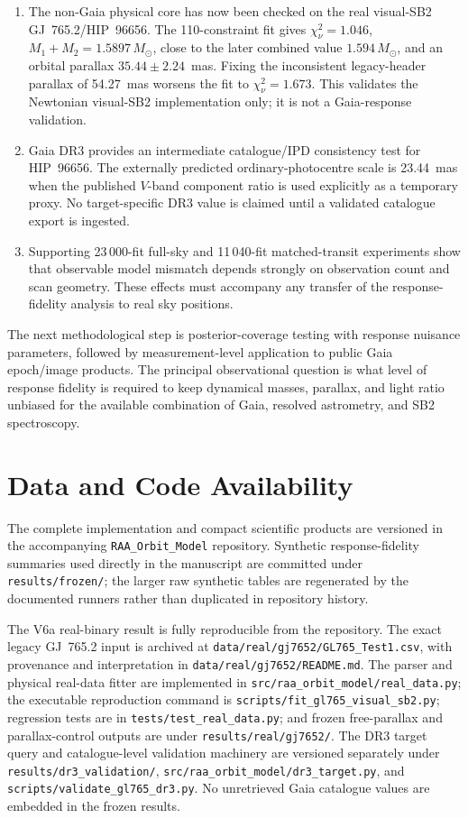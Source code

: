\begin{enumerate}
\item The non-Gaia physical core has now been checked on the real visual-SB2 GJ~765.2/HIP~96656. The 110-constraint fit gives $\chi^2_\nu=1.046$, $M_1+M_2=1.5897\,M_\odot$, close to the later combined value $1.594\,M_\odot$, and an orbital parallax $35.44\pm2.24$~mas. Fixing the inconsistent legacy-header parallax of 54.27~mas worsens the fit to $\chi^2_\nu=1.673$. This validates the Newtonian visual-SB2 implementation only; it is not a Gaia-response validation.

\item Gaia DR3 provides an intermediate catalogue/IPD consistency test for HIP~96656. The externally predicted ordinary-photocentre scale is 23.44~mas when the published $V$-band component ratio is used explicitly as a temporary proxy. No target-specific DR3 value is claimed until a validated catalogue export is ingested.

\item Supporting 23\,000-fit full-sky and 11\,040-fit matched-transit experiments show that observable model mismatch depends strongly on observation count and scan geometry. These effects must accompany any transfer of the response-fidelity analysis to real sky positions.
\end{enumerate}

The next methodological step is posterior-coverage testing with response nuisance parameters, followed by measurement-level application to public Gaia epoch/image products. The principal observational question is what level of response fidelity is required to keep dynamical masses, parallax, and light ratio unbiased for the available combination of Gaia, resolved astrometry, and SB2 spectroscopy.

\section*{Data and Code Availability}

The complete implementation and compact scientific products are versioned in the accompanying \texttt{RAA\_Orbit\_Model} repository. Synthetic response-fidelity summaries used directly in the manuscript are committed under \texttt{results/frozen/}; the larger raw synthetic tables are regenerated by the documented runners rather than duplicated in repository history.

The V6a real-binary result is fully reproducible from the repository. The exact legacy GJ~765.2 input is archived at \texttt{data/real/gj7652/GL765\_Test1.csv}, with provenance and interpretation in \texttt{data/real/gj7652/README.md}. The parser and physical real-data fitter are implemented in \texttt{src/raa\_orbit\_model/real\_data.py}; the executable reproduction command is \texttt{scripts/fit\_gl765\_visual\_sb2.py}; regression tests are in \texttt{tests/test\_real\_data.py}; and frozen free-parallax and parallax-control outputs are under \texttt{results/real/gj7652/}. The DR3 target query and catalogue-level validation machinery are versioned separately under \texttt{results/dr3\_validation/}, \texttt{src/raa\_orbit\_model/dr3\_target.py}, and \texttt{scripts/validate\_gl765\_dr3.py}. No unretrieved Gaia catalogue values are embedded in the frozen results.


